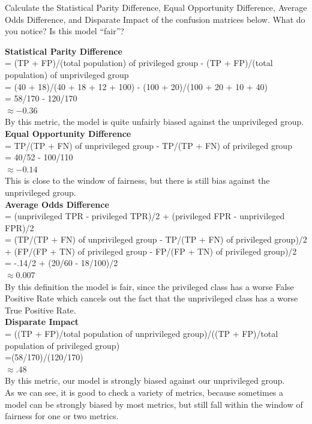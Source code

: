 \documentclass[assignment03_Solutions]{subfiles}
\begin{document}
\begin{exercise}[(40 Minutes)]
\bes
\item Calculate the Statistical Parity Difference, Equal Opportunity Difference, Average Odds Difference, and Disparate Impact of the confusion matrices below. What do you notice? Is this model ``fair''?



\begin{boxedsolution}
\textbf{Statistical Parity Difference}\\
= (TP + FP)/(total population) of privileged group - (TP + FP)/(total population) of unprivileged group\\
=  (40 + 18)/(40 + 18 + 12 + 100) - (100 + 20)/(100 + 20 + 10 + 40)\\
= 58/170 - 120/170\\
$\approx -0.36$\\
By this metric, the model is quite unfairly biased against the unprivileged group.\\
\textbf{Equal Opportunity Difference}\\
= TP/(TP + FN) of unprivileged group - TP/(TP + FN) of privileged group\\
= 40/52 - 100/110\\
$\approx -0.14$\\
This is close to the window of fairness, but there is still bias against the unprivileged group.\\
\textbf{Average Odds Difference}\\
= (unprivileged TPR - privileged TPR)/2 + (privileged FPR - unprivileged FPR)/2\\
= (TP/(TP + FN) of unprivileged group - TP/(TP + FN) of privileged group)/2 + (FP/(FP + TN) of privileged group - FP/(FP + TN) of privileged group)/2\\
= -.14/2 + (20/60 - 18/100)/2\\
$\approx 0.007$\\
By this definition the model is fair, since the privileged class has a worse False Positive Rate which cancels out the fact that the unprivileged class has a worse True Positive Rate.\\
\textbf{Disparate Impact}\\
= ((TP + FP)/total population of unprivileged group)/((TP + FP)/total population of privileged group)\\
=(58/170)/(120/170)\\
$\approx .48$\\
By this metric, our model is strongly biased against our unprivileged group.\\
As we can see, it is good to check a variety of metrics, because sometimes a model can be strongly biased by most metrics, but still fall within the window of fairness for one or two metrics.
\end{boxedsolution}


\end{exercise}
\end{document}
